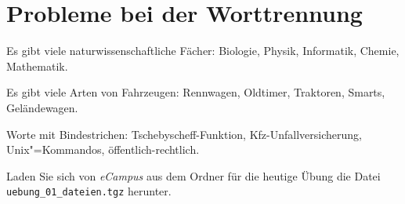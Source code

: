 \documentclass[12pt,a4paper]{scrartcl}
\begin{document}
%
\section{Probleme bei der Worttrennung}
Es gibt viele naturwissenschaftliche Fächer: Biologie, Physik,
Informatik, Chemie, Mathematik.

Es gibt viele Arten von Fahrzeugen: Rennwagen, Oldtimer, Traktoren,
Smarts, Geländewagen.

Worte mit Bindestrichen: Tschebyscheff-Funktion,
Kfz-Unfallversicherung, Unix"=Kommandos, öffentlich-rechtlich.

Laden Sie sich von \textit{eCampus} aus dem Ordner für die heutige
Übung die Datei \texttt{uebung\_01\_dateien.tgz} herunter.
\end{document}
